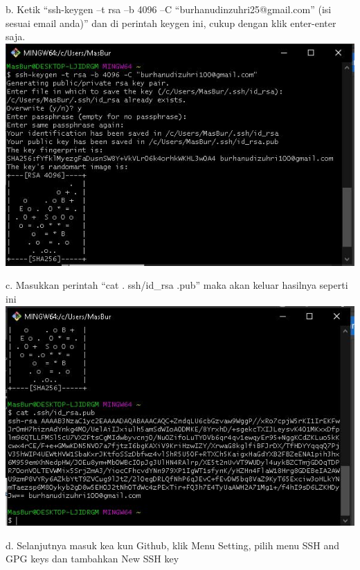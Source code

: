 \documentclass{article}
\begin{document}
                \newline
            \item b. Ketik “ssh-keygen –t rsa –b 4096 –C “burhanudinzuhri25@gmail.com” (isi sesuai email anda)” dan  di perintah keygen ini, cukup dengan klik enter-enter saja.
                \newline
                \includegraphics[scale=0.5]{32.3b.jpg}
                \newline
            \item c. Masukkan perintah “cat . ssh/id_rsa .pub” maka akan keluar hasilnya seperti ini
                \newline
                \includegraphics[scale=0.5]{32.3c.jpg}
                \newline
            \item d. Selanjutnya masuk kea kun Github, klik Menu Setting, pilih menu SSH and GPG keys dan tambahkan New SSH key
                \newline
\end{document}
